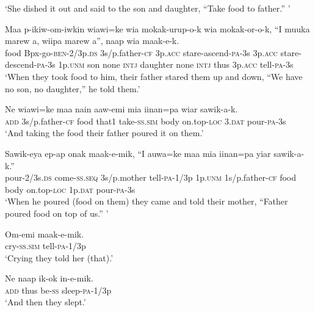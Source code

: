 {\glt ‘She dished it out and said to the son and daughter, “Take food to father.” ’ \\
\z


\ea\label{ex:a:x9}
\gll  Maa  p-ikiw-om-iwkin  wiawi=ke  wia  mokak-urup-o-k              wia  mokak-or-o-k,  “I  muuka  marew  a,  wiipa                 marew  a”,  naap  wia  maak-e-k. \\
food  Bpx-go-\textsc{ben}-2/3p.\textsc{ds}  3s/p.father-\textsc{cf}  3p.\textsc{acc}  stare-ascend-\textsc{pa}-3s   3p.\textsc{acc}  stare-descend-\textsc{pa}-3s  1p.\textsc{unm}  son  none  \textsc{intj}  daughter  none  \textsc{intj}  thus  3p.\textsc{acc}  tell-\textsc{pa}-3s \\




\glt ‘When they took food to him, their father stared them up and down, “We have no son, no daughter,” he told them.’ \\
\z


\ea\label{ex:a:x10}
\gll  Ne  wiawi=ke  maa  nain  aaw-emi  mia  iinan=pa  wiar  sawik-a-k. \\
\textsc{add}  3s/p.father-\textsc{cf}  food  that1  take-\textsc{ss}.\textsc{sim}  body  on.top-\textsc{loc}  3.\textsc{dat}  pour-\textsc{pa}-3s \\
\glt ‘And taking the food their father poured it on them.’ \\
\z


\ea\label{ex:a:x11}
\gll  Sawik-eya  ep-ap  onak  maak-e-mik,  “I  auwa=ke                         maa  mia  iinan=pa  yiar  sawik-a-k.” \\
pour-2/3s.\textsc{ds}  come-\textsc{ss.seq}  3s/p.mother  tell-\textsc{pa}-1/3p  1p.\textsc{unm}  1s/p.father-\textsc{cf}   food  body  on.top-\textsc{loc}  1p.\textsc{dat}  pour-\textsc{pa}-3s \\


\glt ‘When he poured (food on them) they came and told their mother, “Father poured food on top of us.” ’ \\
\z


\ea\label{ex:a:x12}
\gll  Om-emi  maak-e-mik. \\
cry-\textsc{ss}.\textsc{sim}  tell-\textsc{pa}-1/3p \\
\glt ‘Crying they told her (that).’ \\
\z


\ea\label{ex:a:x13}
\gll  Ne  naap  ik-ok  in-e-mik. \\
\textsc{add}  thus  be-\textsc{ss}  sleep-\textsc{pa}-1/3p \\
\glt ‘And then they slept.’ \\
\z


}
